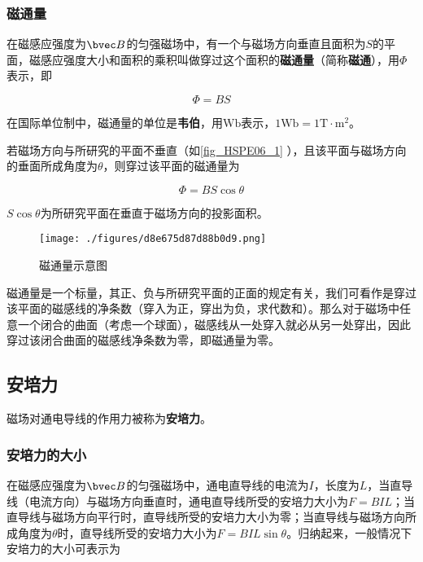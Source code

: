 \subsubsection{磁通量}

在磁感应强度为$\bvec B$的匀强磁场中，有一个与磁场方向垂直且面积为$S$的平面，磁感应强度大小和面积的乘积叫做穿过这个面积的\textbf{磁通量}（简称\textbf{磁通}），用$\Phi$表示，即

\begin{equation}
\Phi = BS
\end{equation}

在国际单位制中，磁通量的单位是\textbf{韦伯}，用$\mathrm{Wb}$表示，$1\mathrm{Wb}=1\mathrm{T\cdot m^2}$。

若磁场方向与所研究的平面不垂直（如\autoref{fig_HSPE06_1} ），且该平面与磁场方向的垂面所成角度为$\theta$，则穿过该平面的磁通量为

\begin{equation}
\Phi = BS\cos\theta
\end{equation}

$S\cos\theta$为所研究平面在垂直于磁场方向的投影面积。

\begin{figure}[ht]
\centering
\texttt{[image: ./figures/d8e675d87d88b0d9.png]}
\caption{磁通量示意图} \label{fig_HSPE06_1}
\end{figure}


磁通量是一个标量，其正、负与所研究平面的正面的规定有关，我们可看作是穿过该平面的磁感线的净条数（穿入为正，穿出为负，求代数和）。那么对于磁场中任意一个闭合的曲面（考虑一个球面），磁感线从一处穿入就必从另一处穿出，因此穿过该闭合曲面的磁感线净条数为零，即磁通量为零。

\subsection{安培力}

磁场对通电导线的作用力被称为\textbf{安培力}。

\subsubsection{安培力的大小}

在磁感应强度为$\bvec B$的匀强磁场中，通电直导线的电流为$I$，长度为$L$，当直导线（电流方向）与磁场方向垂直时，通电直导线所受的安培力大小为$F=BIL$；当直导线与磁场方向平行时，直导线所受的安培力大小为零；当直导线与磁场方向所成角度为$\theta$时，直导线所受的安培力大小为$F=BIL\sin\theta$。归纳起来，一般情况下安培力的大小可表示为

